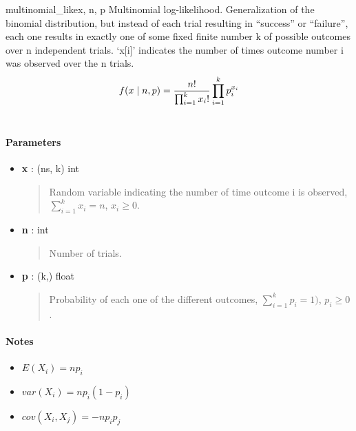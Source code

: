 \hypertarget{pymc.distributions.multinomial_like}{}\begin{funcdesc}{multinomial\_like}{x, n, p}
Multinomial log-likelihood. Generalization of the binomial
distribution, but instead of each trial resulting in ``success'' or
``failure'', each one results in exactly one of some fixed finite number k
of possible outcomes over n independent trials. `x{[}i{]}' indicates the number
of times outcome number i was observed over the n trials.
\begin{gather}
\begin{split}f(x \mid n, p) = \frac{n!}{\prod_{i=1}^k x_i!} \prod_{i=1}^k p_i^{x_i}\end{split}\notag\\\begin{split}\end{split}\notag
\end{gather}\paragraph{Parameters}\begin{itemize}

\item[] \textbf{x} : (ns, k) int
\begin{quote}

Random variable indicating the number of time outcome i is observed,
$\sum_{i=1}^k x_i=n$, $x_i \ge 0$.
\end{quote}

\item[] \textbf{n} : int
\begin{quote}

Number of trials.
\end{quote}

\item[] \textbf{p} : (k,) float
\begin{quote}

Probability of each one of the different outcomes,
$\sum_{i=1}^k p_i = 1)$, $p_i \ge 0$.
\end{quote}
\end{itemize}
\paragraph{Notes}
\begin{itemize}
\item {} 
$E(X_i)=n p_i$

\item {} 
$var(X_i)=n p_i(1-p_i)$

\item {} 
$cov(X_i,X_j) = -n p_i p_j$

\end{itemize}
\end{funcdesc}



